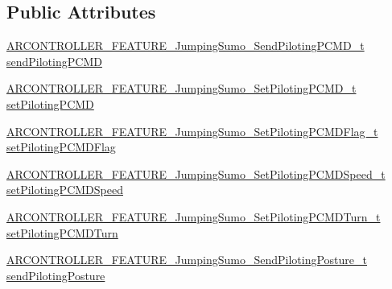 \subsection*{Public Attributes}
\begin{DoxyCompactItemize}
\item 
\hyperlink{_a_r_c_o_n_t_r_o_l_l_e_r___feature_8h_aaacd61dbb4cfc300aae028cd08bd6e0e}{A\+R\+C\+O\+N\+T\+R\+O\+L\+L\+E\+R\+\_\+\+F\+E\+A\+T\+U\+R\+E\+\_\+\+Jumping\+Sumo\+\_\+\+Send\+Piloting\+P\+C\+M\+D\+\_\+t} \hyperlink{struct_a_r_c_o_n_t_r_o_l_l_e_r___f_e_a_t_u_r_e___jumping_sumo__t_a2375547f00b541cf42d8ccbb389317e8}{send\+Piloting\+P\+C\+MD}
\item 
\hyperlink{_a_r_c_o_n_t_r_o_l_l_e_r___feature_8h_a9e5c6a2927111af337e1c69fea3816f7}{A\+R\+C\+O\+N\+T\+R\+O\+L\+L\+E\+R\+\_\+\+F\+E\+A\+T\+U\+R\+E\+\_\+\+Jumping\+Sumo\+\_\+\+Set\+Piloting\+P\+C\+M\+D\+\_\+t} \hyperlink{struct_a_r_c_o_n_t_r_o_l_l_e_r___f_e_a_t_u_r_e___jumping_sumo__t_a7deec53c25b5570863da022bfd07ff31}{set\+Piloting\+P\+C\+MD}
\item 
\hyperlink{_a_r_c_o_n_t_r_o_l_l_e_r___feature_8h_a1e5cc0d37ebbfbb73dae72ff2207a5eb}{A\+R\+C\+O\+N\+T\+R\+O\+L\+L\+E\+R\+\_\+\+F\+E\+A\+T\+U\+R\+E\+\_\+\+Jumping\+Sumo\+\_\+\+Set\+Piloting\+P\+C\+M\+D\+Flag\+\_\+t} \hyperlink{struct_a_r_c_o_n_t_r_o_l_l_e_r___f_e_a_t_u_r_e___jumping_sumo__t_a354b5c74db867f959813d66b69edb101}{set\+Piloting\+P\+C\+M\+D\+Flag}
\item 
\hyperlink{_a_r_c_o_n_t_r_o_l_l_e_r___feature_8h_aaee898732f16caec124780ba218b8130}{A\+R\+C\+O\+N\+T\+R\+O\+L\+L\+E\+R\+\_\+\+F\+E\+A\+T\+U\+R\+E\+\_\+\+Jumping\+Sumo\+\_\+\+Set\+Piloting\+P\+C\+M\+D\+Speed\+\_\+t} \hyperlink{struct_a_r_c_o_n_t_r_o_l_l_e_r___f_e_a_t_u_r_e___jumping_sumo__t_a3f09e080467e6d4542f57adae107e668}{set\+Piloting\+P\+C\+M\+D\+Speed}
\item 
\hyperlink{_a_r_c_o_n_t_r_o_l_l_e_r___feature_8h_aa4e43bd78ac512af4231e2d0f30a9ef0}{A\+R\+C\+O\+N\+T\+R\+O\+L\+L\+E\+R\+\_\+\+F\+E\+A\+T\+U\+R\+E\+\_\+\+Jumping\+Sumo\+\_\+\+Set\+Piloting\+P\+C\+M\+D\+Turn\+\_\+t} \hyperlink{struct_a_r_c_o_n_t_r_o_l_l_e_r___f_e_a_t_u_r_e___jumping_sumo__t_a32f01cd700aa93a416b7411ac5ed7049}{set\+Piloting\+P\+C\+M\+D\+Turn}
\item 
\hyperlink{_a_r_c_o_n_t_r_o_l_l_e_r___feature_8h_a793ccee551ef4400a2f2869d80b93207}{A\+R\+C\+O\+N\+T\+R\+O\+L\+L\+E\+R\+\_\+\+F\+E\+A\+T\+U\+R\+E\+\_\+\+Jumping\+Sumo\+\_\+\+Send\+Piloting\+Posture\+\_\+t} \hyperlink{struct_a_r_c_o_n_t_r_o_l_l_e_r___f_e_a_t_u_r_e___jumping_sumo__t_a695fbdee0f632c015e0ffdf827595f88}{send\+Piloting\+Posture}

\end{DoxyCompactItemize}
